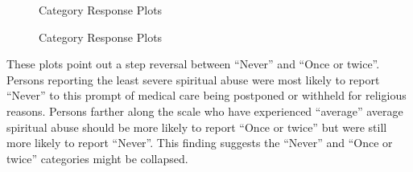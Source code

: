 \documentclass[
  letterpaper,
]{article}
\begin{document}
\begin{figure}


\caption{\label{fig-RM-plot1-1}Category Response Plots}

\end{figure}%

\begin{figure}


\caption{\label{fig-RM-plot1-2}Category Response Plots}

\end{figure}%

These plots point out a step reversal between ``Never'' and ``Once or
twice''. Persons reporting the least severe spiritual abuse were most
likely to report ``Never'' to this prompt of medical care being
postponed or withheld for religious reasons. Persons farther along the
scale who have experienced ``average'' average spiritual abuse should be
more likely to report ``Once or twice'' but were still more likely to
report ``Never''. This finding suggests the ``Never'' and ``Once or
twice'' categories might be collapsed.
\end{document}
